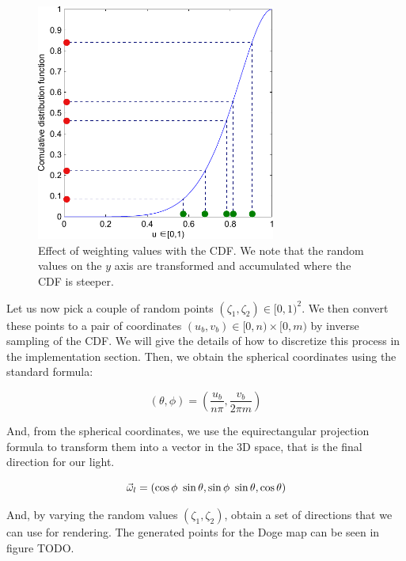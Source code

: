 
\begin{figure}
\centering
\includegraphics[width=0.7\textwidth]{images/matlab/cdfex.pdf}
\caption{Effect of weighting values with the CDF. We note that the random values on the $y$ axis are transformed and accumulated where the CDF is steeper.}
\label{fig:cdfweight}
\end{figure}

Let us now pick a couple of random points $(\zeta_1,\zeta_2) \in [0,1)^2$. We then convert these points to a pair of coordinates $(u_b,v_b) \in [0,n)\times[0,m)$ by inverse sampling of the CDF. We will give the details of how to discretize this process in the implementation section. Then, we obtain the spherical coordinates using the standard formula:

$$
(\theta, \phi) = \left(\frac{u_b}{n\pi}, \frac{v_b}{2 \pi m}\right)
$$

And, from the spherical coordinates, we use the equirectangular projection formula to transform them into a vector in the 3D space, that is the final direction for our light.

$$
\vec{\omega}_l = (\cos\phi\  \sin\theta, \sin\phi\  \sin\theta, \cos\theta)
$$

And, by varying the random values $(\zeta_1,\zeta_2)$, obtain a set of directions that we can use for rendering. The generated points for the Doge map can be seen in figure TODO.